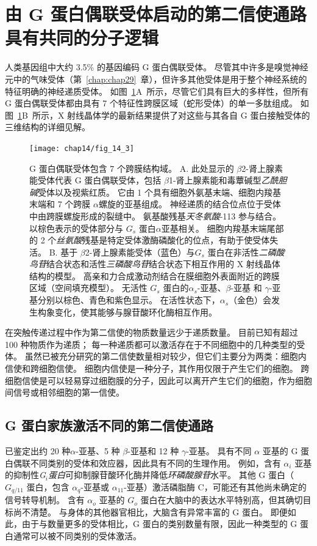 \section{由 G 蛋白偶联受体启动的第二信使通路具有共同的分子逻辑}

人类基因组中大约 3.5\% 的基因编码 G 蛋白偶联受体。
尽管其中许多是嗅觉神经元中的气味受体（第~\ref{chap:chap29}~章），但许多其他受体是用于整个神经系统的特征明确的神经递质受体。
如图~\ref{fig:14_3}A~所示，尽管它们具有巨大的多样性，但所有 G 蛋白偶联受体都由具有 7 个特征性跨膜区域（蛇形受体）的单一多肽组成。
如图~\ref{fig:14_3}B~所示，X 射线晶体学的最新结果提供了对这些与其各自 G 蛋白接触受体的三维结构的详细见解。


\begin{figure}[htbp]
	\centering
	\texttt{[image: chap14/fig\_14\_3]}
	\caption{G 蛋白偶联受体包含 7 个跨膜结构域。
		A. 此处显示的 $\beta$2-肾上腺素能受体代表 G 蛋白偶联受体，包括 $\beta$1-肾上腺素能和毒蕈碱型\textit{乙酰胆碱}受体以及视紫红质。
		它由 1 个具有细胞外氨基末端、细胞内羧基末端和 7 个跨膜 $\alpha$螺旋的亚基组成。
		神经递质的结合位点位于受体中由跨膜螺旋形成的裂缝中。
		氨基酸残基\textit{天冬氨酸}-113 参与结合。
		以棕色表示的受体部分与 $ G_s $ 蛋白$\alpha$亚基相关。
		细胞内羧基末端尾部的 2 个\textit{丝氨酸}残基是特定受体激酶磷酸化的位点，有助于使受体失活\cite{frielle1989beta}。
		B. 基于 $\beta$2-肾上腺素能受体（蓝色）与$ G_s $ 蛋白在非活性\textit{二磷酸鸟苷}结合状态和活性\textit{三磷酸鸟苷}结合状态下相互作用的 X 射线晶体结构的模型。
		高亲和力合成激动剂结合在膜细胞外表面附近的跨膜区域（空间填充模型）。
		无活性 $ G_s $ 蛋白的$\alpha_s$-亚基、$\beta$-亚基 和 $\gamma$-亚基分别以棕色、青色和紫色显示。
		在活性状态下，$\alpha_s$（金色）会发生构象变化，使其能够与腺苷酸环化酶相互作用\cite{kobilka2013structural}。}
	\label{fig:14_3}
\end{figure}


在突触传递过程中作为第二信使的物质数量远少于递质数量。
目前已知有超过 100 种物质作为递质；
每一种递质都可以激活存在于不同细胞中的几种类型的受体。
虽然已被充分研究的第二信使数量相对较少，但它们主要分为两类：细胞内信使和跨细胞信使。
细胞内信使是一种分子，其作用仅限于产生它们的细胞。
跨细胞信使是可以轻易穿过细胞膜的分子，因此可以离开产生它们的细胞，作为细胞间信号或相邻细胞的第一信使。


\subsection{G 蛋白家族激活不同的第二信使通路}

已鉴定出约 20 种$\alpha$-亚基、5 种 $\beta$-亚基和 12 种 $\gamma$-亚基。
具有不同 $\alpha$ 亚基的 G 蛋白偶联不同类别的受体和效应器，因此具有不同的生理作用。
例如，含有 $\alpha _i$ 亚基的抑制性\textit{G$_i $蛋白}可抑制腺苷酸环化酶并降低\textit{环磷酸腺苷}水平。
其他 G 蛋白（$ G_{q/11} $ 蛋白，包含 $\alpha_q$-亚基或 $\alpha_{11}$-亚基）激活磷脂酶 C，可能还有其他尚未确定的信号转导机制。
含有 $\alpha_o$ 亚基的 $G_o$ 蛋白在大脑中的表达水平特别高，但其确切目标尚不清楚。
与身体的其他器官相比，大脑含有异常丰富的 G 蛋白。
即便如此，由于与数量更多的受体相比，G 蛋白的类别数量有限，因此一种类型的 G 蛋白通常可以被不同类别的受体激活。


